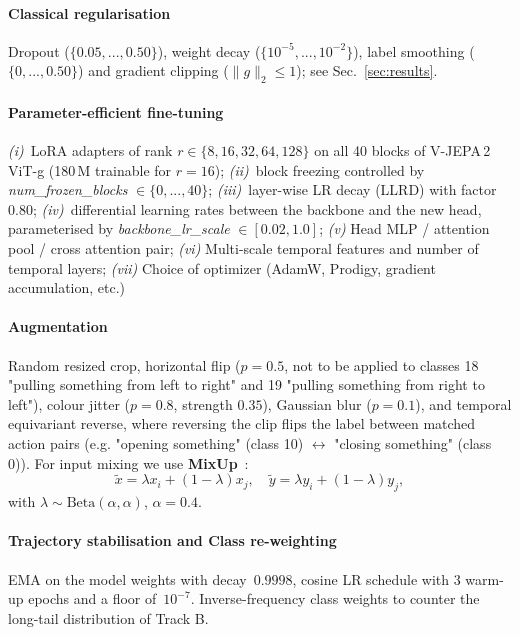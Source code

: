 \documentclass[10pt,twocolumn,letterpaper]{article}
\begin{document}
\paragraph{Classical regularisation} Dropout
($\{0.05,...,0.50\}$), weight decay
($\{10^{-5},...,10^{-2}\}$), label smoothing
($\{0,...,0.50\}$) and gradient clipping
($\|g\|_2 \le 1$); see Sec.~\ref{sec:results}.

\paragraph{Parameter-efficient fine-tuning}
\emph{(i)}~LoRA adapters of rank
$r \in \{8,16,32,64,128\}$ on all 40 blocks of V-JEPA\,2 ViT-g (180\,M
trainable for $r{=}16$); \emph{(ii)}~block freezing controlled by
\textit{num\_frozen\_blocks} $\in \{0,...,40\}$; \emph{(iii)}~layer-wise
LR decay (LLRD) with factor~$0.80$; \emph{(iv)}~differential learning
rates between the backbone and the new head, parameterised by
\textit{backbone\_lr\_scale} $\in [0.02,1.0]$; \emph{(v)} Head MLP / attention pool / cross attention pair; \emph{(vi)} Multi-scale temporal features and number of temporal layers; \emph{(vii)} Choice of optimizer (AdamW, Prodigy, gradient accumulation, etc.)

\paragraph{Augmentation} Random resized crop, horizontal flip
($p{=}0.5$, not to be applied to classes 18 "pulling something from left to right" and 19 "pulling something from right to left"), colour jitter ($p{=}0.8$, strength $0.35$), Gaussian blur
($p{=}0.1$), and temporal equivariant reverse, where reversing
the clip flips the label between matched action pairs (e.g. "opening something"
(class 10) $\leftrightarrow$ "closing something"
(class 0)). For input mixing we use
\textbf{MixUp}~\cite{zhang2018mixup}:
\begin{equation}
\tilde{x} = \lambda x_i + (1-\lambda) x_j,\quad
\tilde{y} = \lambda y_i + (1-\lambda) y_j,
\end{equation}
with $\lambda \sim \text{Beta}(\alpha,\alpha)$, $\alpha=0.4$.

\paragraph{Trajectory stabilisation and Class re-weighting} EMA on the model weights with
decay~$0.9998$, cosine LR schedule with $3$ warm-up epochs and a
floor of~$10^{-7}$. Inverse-frequency class weights to
counter the long-tail distribution of Track B.
\end{document}
